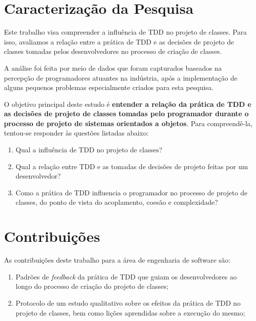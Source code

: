 \section{Caracterização da Pesquisa}

Este trabalho
visa compreender a influência de TDD no projeto de classes.
Para isso, avaliamos a relação entre a prática de 
TDD
e as decisões de projeto de classes tomadas pelos desenvolvedores no processo de 
criação de classes.

A análise foi feita por meio de dados que foram
capturados baseados na percepção de programadores atuantes na indústria, após
a implementação de alguns pequenos problemas especialmente criados para
esta pesquisa.

O objetivo principal deste estudo é \textbf{entender a relação da prática de TDD 
e as decisões de projeto de classes tomadas pelo programador durante o processo de 
projeto de sistemas orientados a objetos}.
Para compreendê-la, tentou-se responder às questões listadas
abaixo:

\begin{enumerate}

	\item Qual a influência de TDD no projeto de classes?

	\item Qual a relação entre TDD e as tomadas de decisões de projeto
	feitas por um desenvolvedor?

	\item Como a prática de TDD influencia o programador no processo de  
	projeto de classes, do ponto de vista do acoplamento, coesão e complexidade?

\end{enumerate}

\section{Contribuições}

As contribuições deste trabalho para a área de engenharia de software
são:

\begin{enumerate}
	\item Padrões de \textit{feedback} da prática de TDD que guiam os desenvolvedores
	ao longo do processo de criação do projeto de classes;

	\item Protocolo de um estudo qualitativo sobre os efeitos da prática
	de TDD no projeto de classes, bem como lições aprendidas sobre a execução do mesmo;
		
\end{enumerate}

